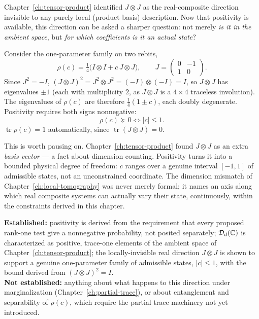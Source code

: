 Chapter~\ref{ch:tensor-product} identified $J\otimes J$ as the real-composite
direction invisible to any purely local (product-basis) description. Now that
positivity is available, this direction can be asked a sharper question: not
merely \emph{is it in the ambient space}, but \emph{for which coefficients is
it an actual state}?

\begin{example}
\label{ex:JJ-bound}
Consider the one-parameter family on two rebits,
\begin{equation}
\rho(c) = \tfrac14\big(I\otimes I + c\, J\otimes J\big), \qquad J =
\begin{pmatrix} 0 & -1 \\ 1 & 0 \end{pmatrix}.
\end{equation}
Since $J^2 = -I$, $(J\otimes J)^2 = J^2\otimes J^2 = (-I)\otimes(-I) = I$, so
$J\otimes J$ has eigenvalues $\pm1$ (each with multiplicity $2$, as $J\otimes
J$ is a $4\times4$ traceless involution). The eigenvalues of $\rho(c)$ are
therefore $\tfrac14(1\pm c)$, each doubly degenerate. Positivity requires both
signs nonnegative:
\begin{equation}
\rho(c) \succeq 0 \iff |c| \le 1.
\end{equation}
$\operatorname{tr}\rho(c) = 1$ automatically, since $\operatorname{tr}(J\otimes
J) = 0$.
\end{example}

\begin{remark}
This is worth pausing on. Chapter~\ref{ch:tensor-product} found $J\otimes J$
as an extra \emph{basis vector} — a fact about dimension counting. Positivity
turns it into a bounded physical degree of freedom: $c$ ranges over a genuine
interval $[-1,1]$ of admissible states, not an unconstrained coordinate. The
dimension mismatch of Chapter~\ref{ch:local-tomography} was never merely
formal; it names an axis along which real composite systems can actually vary
their state, continuously, within the constraints derived in this chapter.
\end{remark}

\begin{ledgerentry}
\textbf{Established:} positivity is derived from the requirement that every
proposed rank-one test give a nonnegative probability, not posited
separately; $\mathcal D_d(\mathbb{C})$ is characterized as positive, trace-one
elements of the ambient space of Chapter~\ref{ch:tensor-product}; the
locally-invisible real direction $J\otimes J$ is shown to support a genuine
one-parameter family of admissible states, $|c|\le1$, with the bound derived
from $(J\otimes J)^2=I$.\\
\textbf{Not established:} anything about what happens to this direction under
marginalization (Chapter~\ref{ch:partial-trace}), or about entanglement and
separability of $\rho(c)$, which require the partial trace machinery not yet
introduced.
\end{ledgerentry}
